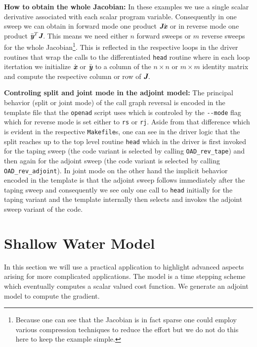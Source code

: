 \documentclass{book}
\newcommand{\bmJ}{\mbox{\bf\em J}}
\newcommand{\bmx}{\mbox{\bf\em x}}
\newcommand{\bmy}{\mbox{\bf\em y}}
\begin{document}
\noindent
{\bf How to obtain the whole Jacobian:} In these examples we use a single scalar derivative associated with each scalar program variable. 
Consequently in one sweep we can obtain in forward mode one product $\bmJ\dot{\bmx}$ or in reverse mode one product $\bar{\bmy}^T\bmJ$. 
This means we need either $n$ forward sweeps or $m$ reverse sweeps for the whole Jacobian\footnote{Because one can see that the Jacobian 
is in fact sparse one could employ various compression techniques to reduce the effort but we do not do this here to keep the example simple.}.   
This is reflected in the respective loops in the driver routines that wrap the calls to the differentiated \lstinline{head} routine where in each loop
itertation we 
initialize $\dot{\bmx}$ or $\bar{\bmy}$ to a column of the $n\times n$ or $m\times m$ identity matrix and compute the respective 
column or row of $\bmJ$.

\noindent
{\bf Controling split and joint mode in the adjoint model:} The principal behavior (split or joint mode) of the call graph reversal is encoded 
in the template file that the \lstinline{openad} script uses which is controled by the \lstinline{--mode} flag which for reverse mode is set 
either to \lstinline{rs} or \lstinline{rj}. Aside from that difference which is evident in the respective \lstinline{Makefile}s, one can 
see in the driver logic that the split reaches up to the top level routine \lstinline{head} which in the driver is first invoked 
for the taping sweep (the code variant is selected by calling \lstinline{OAD_rev_tape}) 
and then again for the adjoint sweep  (the code variant is selected by calling  \lstinline{OAD_rev_adjoint}). 
In joint mode on the other hand the implicit behavior encoded in the template is that the adjoint sweep follows immediately after 
the taping sweep and consequently we see only one call to \lstinline{head} initially for the taping variant  
and the template internally then selects and invokes the adjoint sweep variant of the code.    



\section{Shallow Water Model}\label{sec:shallowWater}
In this section we will use a practical application to highlight 
advanced aspects arising for more complicated applications. 
The model is a time stepping scheme which eventually computes 
a scalar valued cost function. We generate an adjoint model 
to compute the gradient.  
\end{document}
